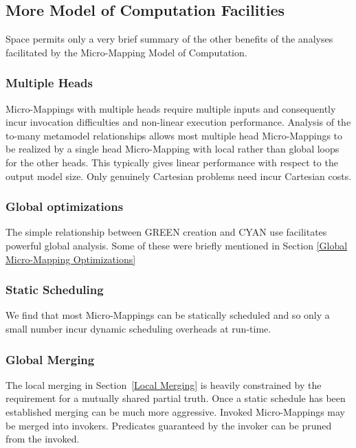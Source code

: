 \documentclass[conference]{IEEEtran}
\begin{document}
\subsection{More Model of Computation Facilities}

Space permits only a very brief summary of the other benefits of the analyses facilitated by the Micro-Mapping Model of Computation.

\subsubsection{Multiple Heads}\label{Multiple Heads}

Micro-Mappings with multiple heads require multiple inputs and consequently incur invocation difficulties and non-linear execution performance. Analysis of the to-many metamodel relationships allows most multiple head Micro-Mappings to be realized by a single head Micro-Mapping with local rather than global loops for the other heads. This typically gives linear performance with respect to the output model size. Only genuinely Cartesian problems need incur Cartesian costs.

\subsubsection{Global optimizations}

The simple relationship between GREEN creation and CYAN use facilitates powerful global analysis. Some of these were briefly mentioned in Section \ref{Global Micro-Mapping Optimizations}

\subsubsection{Static Scheduling}

We find that most Micro-Mappings can be statically scheduled and so only a small number incur dynamic scheduling overheads at run-time.  

\subsubsection{Global Merging}

The local merging in Section~\ref{Local Merging} is heavily constrained by the requirement for a mutually shared partial truth. Once a static schedule has been established merging can be much more aggressive. Invoked Micro-Mappings may be merged into invokers. Predicates guaranteed by the invoker can be pruned from the invoked. 
\end{document}
